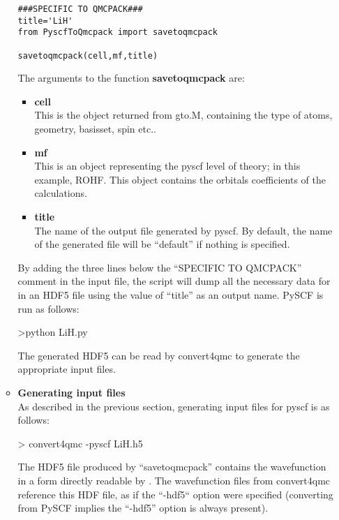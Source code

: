 \begin{itemize}
\begin{itemize}
\begin{lstlisting}[style=Python]
###SPECIFIC TO QMCPACK###
title='LiH'
from PyscfToQmcpack import savetoqmcpack

savetoqmcpack(cell,mf,title)
\end{lstlisting}

The arguments to the function \textbf{savetoqmcpack} are:\\
\begin{itemize}
 \item \textbf{cell}\\
 This is the object returned from gto.M, containing the type of atoms, geometry, basisset, spin etc.. \\
 \item \textbf{mf}\\
This is an object representing the pyscf level of theory; in this example, ROHF. This object contains the orbitals coefficients of the calculations. \\
 \item \textbf{title}\\
 The name of the output file generated by pyscf. By default, the name of the generated file will be ``default'' if nothing is specified.\\
 \end{itemize}

By adding the three lines below the ``SPECIFIC TO QMCPACK'' comment  in the input file, the script will dump all the necessary data for \qmcpack in an HDF5 file using the value of ``title'' as an output name. PySCF is run as follows:\\
\begin{shade}
 >python LiH.py
\end{shade}


The generated HDF5 can be read by convert4qmc to generate the appropriate \qmcpack input files.\\

 \item \textbf{Generating input files}\\
 
 As described in the previous section, generating input files for pyscf is as follows:\\
 \begin{shade}
  > convert4qmc -pyscf LiH.h5 
 \end{shade}

The HDF5 file produced by ``savetoqmcpack'' contains the wavefunction in a form directly readable by \qmcpack.
The wavefunction files from convert4qmc reference this HDF file, as if the ``-hdf5`` option were specified
(converting from PySCF implies the ``-hdf5'' option is always present).


\end{itemize}
\end{itemize}
